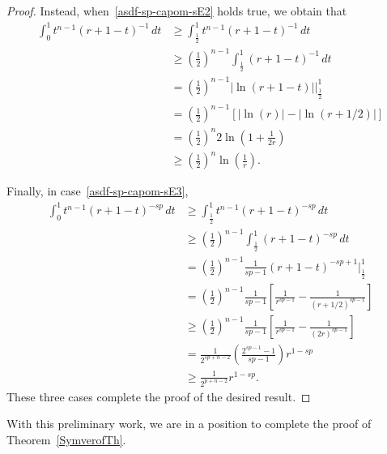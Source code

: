 \documentclass[12pt]{article}
\numberwithin{equation}{section}
\renewcommand{\geq}{\geqslant}
\begin{document}
\begin{appendix}
\begin{proof}
Instead, when~\eqref{asdf-sp-capom-sE2} holds true, we obtain that 
\begin{equation*}
\begin{split}
\int_{0}^1t^{n-1}(r+1-t)^{-1}\,dt&\geq \int_{\frac{1}{2}}^1 t^{n-1}(r+1-t)^{-1}\,dt\\
&\geq \left(\frac{1}{2}\right)^{n-1}\int_{\frac{1}{2}}^1 (r+1-t)^{-1}\,dt\\
&=\left(\frac{1}{2}\right)^{n-1}\left|\ln(r+1-t)\right|\bigg|_{\frac{1}{2}}^1\\
&=\left(\frac{1}{2}\right)^{n-1}\left[\left|\ln(r)\right|-\left|\ln\left(r+1/2\right)\right|\right]\\
&=\left(\frac{1}{2}\right)^{n}2\ln\left(1+\frac{1}{2r}\right)\\
&\geq \left(\frac{1}{2}\right)^{n}\ln\left(\frac{1}{r}\right).
\end{split}
\end{equation*}

Finally, in case~\eqref{asdf-sp-capom-sE3},
\begin{equation*}
\begin{split}
\int_{0}^1t^{n-1}(r+1-t)^{-sp}\,dt&\geq \int_{\frac{1}{2}}^1 t^{n-1}(r+1-t)^{-sp}\,dt\\
&\geq \left(\frac{1}{2}\right)^{n-1}\int_{\frac{1}{2}}^1 (r+1-t)^{-sp}\,dt\\
&=\left(\frac{1}{2}\right)^{n-1}\frac{1}{sp-1}(r+1-t)^{-sp+1}\bigg|_{\frac{1}{2}}^1\\
&=\left(\frac{1}{2}\right)^{n-1}\frac{1}{sp-1}\left[\frac{1}{r^{sp-1}}-\frac{1}{\left(r+1/2\right)^{sp-1}}\right]\\
&\geq \left(\frac{1}{2}\right)^{n-1}\frac{1}{sp-1}\left[\frac{1}{r^{sp-1}}-\frac{1}{\left(2r\right)^{sp-1}}\right]\\
&=\frac{1}{2^{sp+n-2}}\left(\frac{2^{sp-1}-1}{sp-1}\right)r^{1-sp}\\
&\geq \frac{1}{2^{p+n-2}} r^{1-sp}.
\end{split}
\end{equation*}
These three cases complete the proof of the desired result.
\end{proof}

With this preliminary work, we are in a position to complete the proof of Theorem~\ref{SymverofTh}.


\end{appendix}
\end{document}
